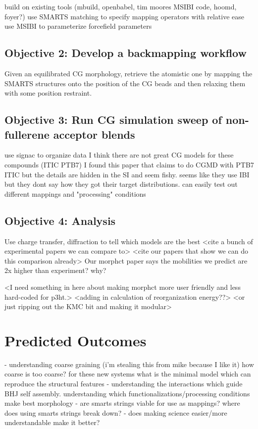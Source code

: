 build on existing tools (mbuild, openbabel, tim moores MSIBI code, hoomd, foyer?)
use SMARTS matching to specify mapping operators with relative ease
use MSIBI to parameterize forcefield parameters

\subsection*{Objective 2: Develop a backmapping workflow}

Given an equilibrated CG morphology, retrieve the atomistic one by mapping the SMARTS structures onto the position of the CG beads and then relaxing them with some position restraint. 

\subsection*{Objective 3: Run CG simulation sweep of non-fullerene acceptor blends}

use signac to organize data
I think there are not great CG models for these compounds (ITIC PTB7) I found this paper \cite{Meng2019} that claims to do CGMD with PTB7 ITIC but the details are hidden in the SI and seem fishy. seems like they use IBI but they dont say how they got their target distributions.
can easily test out different mappings and "processing" conditions

\subsection*{Objective 4: Analysis}

Use charge transfer, diffraction to tell which models are the best
<cite a bunch of experimental papers we can compare to>
<cite our papers that show we can do this comparison already>
Our morphct paper says the mobilities we predict are 2x higher than experiment? why?

<I need something in here about making morphct more user friendly and less hard-coded for p3ht.>
<adding in calculation of reorganization energy??> 
<or just ripping out the KMC bit and making it modular>

\section*{Predicted Outcomes}

- understanding coarse graining (i'm stealing this from mike because I like it) how coarse is too coarse? for these new systems what is the minimal model which can reproduce the structural features
- understanding the interactions which guide BHJ self assembly. understanding which functionalizations/processing conditions make best morphology
- are smarts strings viable for use as mappings? where does using smarts strings break down?
- does making science easier/more understandable make it better? 


